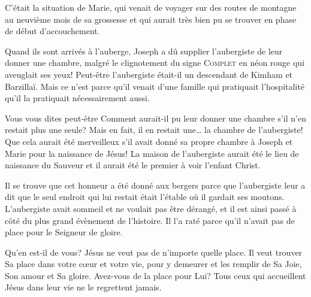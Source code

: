 C'était la situation de Marie, qui venait de voyager sur des routes de montagne au neuvième mois de sa grossesse et qui aurait très bien pu se trouver en phase de début d'accouchement.

Quand ils sont arrivés à l'auberge, Joseph a dû supplier l'aubergiste de leur donner une chambre, malgré le clignotement du signe \textsc{Complet} en néon rouge qui aveuglait ses yeux! Peut-être l'aubergiste était-il un descendant de Kimham et Barzillaï. Mais ce n'est parce qu'il venait d'une famille qui pratiquait l'hospitalité qu'il la pratiquait nécessairement aussi.

Vous vous dites peut-être\frcolon{} \Og Comment aurait-il pu leur donner une chambre s'il n'en restait plus une seule? \Fg{} Mais en fait, il en restait une\dots{} la chambre de l'aubergiste! Que cela aurait été merveilleux s'il avait donné sa propre chambre à Joseph et Marie pour la naissance de Jésus! La maison de l'aubergiste aurait été le lieu de naissance du Sauveur et il aurait été le premier à voir l'enfant Christ.

Il se trouve que cet honneur a été donné aux bergers parce que l'aubergiste leur a dit que le seul endroit qui lui restait était l'étable où il gardait ses moutons. L'aubergiste avait sommeil et ne voulait pas être dérangé, et il est ainsi passé à côté du plus grand évènement de l'histoire. Il l'a raté parce qu'il n'avait pas de place pour le Seigneur de gloire.

Qu'en est-il de vous? Jésus ne veut pas de n'importe quelle place. Il veut trouver Sa place dans votre cœur et votre vie, pour y demeurer et les remplir de Sa Joie, Son amour et Sa gloire. Avez-vous de la place pour Lui? Tous ceux qui accueillent Jésus dans leur vie ne le regrettent jamais.


\begin{dvquotes}


\end{dvquotes}
